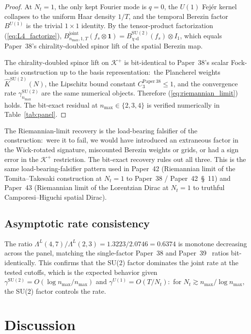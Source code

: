 \documentclass[11pt,a4paper]{article}
\theoremstyle{plain}
\theoremstyle{definition}
\newcommand{\nmax}{n_{\max}}
\newcommand{\Nt}{N_{t}}
\newcommand{\Krein}{\mathcal{K}}
\newcommand{\SU}{\mathrm{SU}}
\newcommand{\Uone}{U(1)}
\newcommand{\Lprop}{\Lambda^{L}}
\newcommand{\Bjoint}{B^{\mathrm{joint}}}
\newcommand{\gammaSU}{\gamma^{\SU(2)}}
\newcommand{\gammaU}{\gamma^{\Uone}}
\newcommand{\Kplus}{\Krein^{+}}
\newcommand{\chid}{\chi\text{-d}}
\newcommand{\Plancherel}{\hat}
\begin{document}
\begin{proof}
At $\Nt = 1$, the only kept Fourier mode is $q = 0$, the $\Uone$ Fej\'er
kernel collapses to the uniform Haar density $1/T$, and the temporal
Berezin factor $B^{\Uone}$ is the trivial $1 \times 1$ identity. By the
tensor-product factorization (\ref{eq:L4_factorize}),
$\Bjoint_{\nmax, 1, T}(f_{s} \otimes \mathbf{1}) =
B^{\SU(2)}_{\chid}(f_{s}) \otimes I_{1}$, which equals
Paper~38's chirality-doubled spinor lift of the spatial Berezin map.

The chirality-doubled spinor lift on $\Kplus$ is bit-identical to
Paper~38's scalar Fock-basis construction up to the basis
representation:\ the Plancherel weights $\Plancherel{K}^{\SU(2)}(N)$,
the Lipschitz bound constant $C_{3}^{\mathrm{Paper~38}} \le 1$, and the
convergence rate $\gammaSU_{\nmax}$ are the same numerical objects.
Therefore (\ref{eq:riemannian_limit}) holds. The bit-exact residual at
$\nmax \in \{2, 3, 4\}$ is verified numerically in Table~\ref{tab:panel}.
\qedhere
\end{proof}

The Riemannian-limit recovery is the load-bearing falsifier of the
construction:\ were it to fail, we would have introduced an extraneous
factor in the Wick-rotated signature, miscounted Berezin weights or
grids, or had a sign error in the $\Kplus$ restriction. The bit-exact
recovery rules out all three. This is the same load-bearing-falsifier
pattern used in Paper~42 (Riemannian limit of the Tomita--Takesaki
construction at $\Nt = 1$ to Paper~38 / Paper~42~\S~11) and Paper~43
(Riemannian limit of the Lorentzian Dirac at $\Nt = 1$ to truthful
Camporesi--Higuchi spatial Dirac).

\subsection{Asymptotic rate consistency}\label{sec:asymp_consistency}

The ratio $\Lprop(4, 7) / \Lprop(2, 3) = 1.3223 / 2.0746 = 0.6374$ is
monotone decreasing across the panel, matching the single-factor
Paper~38 and Paper~39~\cite{paper39} ratios bit-identically. This
confirms that the SU(2) factor dominates the joint rate at the tested
cutoffs, which is the expected behavior given $\gammaSU = O(\log\nmax /
\nmax)$ and $\gammaU = O(T/\Nt)$:\ for $\Nt \gtrsim \nmax/\log\nmax$,
the SU(2) factor controls the rate.

\section{Discussion}\label{sec:discussion}
\end{document}
